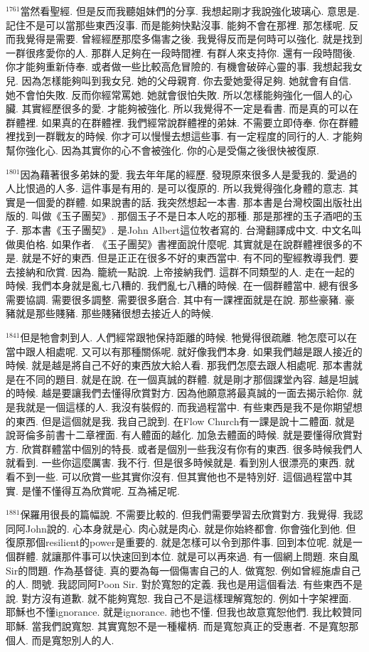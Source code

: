 \documentclass{book}
\begin{document}
$^{1761}$當然看聖經.
但是反而我聽姐妹們的分享.
我想起剛才我說強化玻璃心.
意思是.
記住不是可以當那些東西沒事.
而是能夠快點沒事.
能夠不會在那裡.
那怎樣呢.
反而我覺得是需要.
曾經經歷那麼多傷害之後.
我覺得反而是何時可以強化.
就是找到一群很疼愛你的人.
那群人足夠在一段時間裡.
有群人來支持你.
還有一段時間後.
你才能夠重新侍奉.
或者做一些比較高危冒險的.
有機會破碎心靈的事.
我想起我女兒.
因為怎樣能夠叫到我女兒.
她的父母親育.
你去愛她愛得足夠.
她就會有自信.
她不會怕失敗.
反而你經常罵她.
她就會很怕失敗.
所以怎樣能夠強化一個人的心臟.
其實經歷很多的愛.
才能夠被強化.
所以我覺得不一定是看書.
而是真的可以在群體裡.
如果真的在群體裡.
我們經常說群體裡的弟妹.
不需要立即侍奉.
你在群體裡找到一群戰友的時候.
你才可以慢慢去想這些事.
有一定程度的同行的人.
才能夠幫你強化心.
因為其實你的心不會被強化.
你的心是受傷之後很快被復原.

$^{1801}$因為藉著很多弟妹的愛.
我去年年尾的經歷.
發現原來很多人是愛我的.
愛過的人比恨過的人多.
這件事是有用的.
是可以復原的.
所以我覺得強化身體的意志.
其實是一個愛的群體.
如果說書的話.
我突然想起一本書.
那本書是台灣校園出版社出版的.
叫做《玉子團契》.
那個玉子不是日本人吃的那種.
那是那裡的玉子酒吧的玉子.
那本書《玉子團契》.
是John Albert這位牧者寫的.
台灣翻譯成中文.
中文名叫做奧伯格.
如果作者.
《玉子團契》書裡面說什麼呢.
其實就是在說群體裡很多的不是.
就是不好的東西.
但是正正在很多不好的東西當中.
有不同的聖經教導我們.
要去接納和欣賞.
因為.
籠統一點說.
上帝接納我們.
這群不同類型的人.
走在一起的時候.
我們本身就是亂七八糟的.
我們亂七八糟的時候.
在一個群體當中.
總有很多需要協調.
需要很多調整.
需要很多磨合.
其中有一課裡面就是在說.
那些豪豬.
豪豬就是那些賤豬.
那些賤豬很想去接近人的時候.

$^{1841}$但是牠會刺到人.
人們經常跟牠保持距離的時候.
牠覺得很疏離.
牠怎麼可以在當中跟人相處呢.
又可以有那種關係呢.
就好像我們本身.
如果我們越是跟人接近的時候.
就是越是將自己不好的東西放大給人看.
那我們怎麼去跟人相處呢.
那本書就是在不同的題目.
就是在說.
在一個真誠的群體.
就是剛才那個課堂內容.
越是坦誠的時候.
越是要讓我們去懂得欣賞對方.
因為他願意將最真誠的一面去揭示給你.
就是我就是一個這樣的人.
我沒有裝假的.
而我過程當中.
有些東西是我不是你期望想的東西.
但是這個就是我.
我自己說到.
在Flow Church有一課是說十二體面.
就是說哥倫多前書十二章裡面.
有人體面的越化.
加急去體面的時候.
就是要懂得欣賞對方.
欣賞群體當中個別的特長.
或者是個別一些我沒有你有的東西.
很多時候我們人就看到.
一些你這麼厲害.
我不行.
但是很多時候就是.
看到別人很漂亮的東西.
就看不到一些.
可以欣賞一些其實你沒有.
但其實他也不是特別好.
這個過程當中其實.
是懂不懂得互為欣賞呢.
互為補足呢.

$^{1881}$保羅用很長的篇幅說.
不需要比較的.
但我們需要學習去欣賞對方.
我覺得.
我認同阿John說的.
心本身就是心.
肉心就是肉心.
就是你始終都會.
你會強化到他.
但復原那個resilient的power是重要的.
就是怎樣可以令到那件事.
回到本位呢.
就是一個群體.
就讓那件事可以快速回到本位.
就是可以再來過.
有一個網上問題.
來自風Sir的問題.
作為基督徒.
真的要為每一個傷害自己的人.
做寬恕.
例如曾經施虐自己的人.
問號.
我認同阿Poon Sir.
對於寬恕的定義.
我也是用這個看法.
有些東西不是說.
對方沒有道歉.
就不能夠寬恕.
我自己不是這樣理解寬恕的.
例如十字架裡面.
耶穌也不懂ignorance.
就是ignorance.
祂也不懂.
但我也故意寬恕他們.
我比較贊同耶穌.
當我們說寬恕.
其實寬恕不是一種權柄.
而是寬恕真正的受惠者.
不是寬恕那個人.
而是寬恕別人的人.
\end{document}
